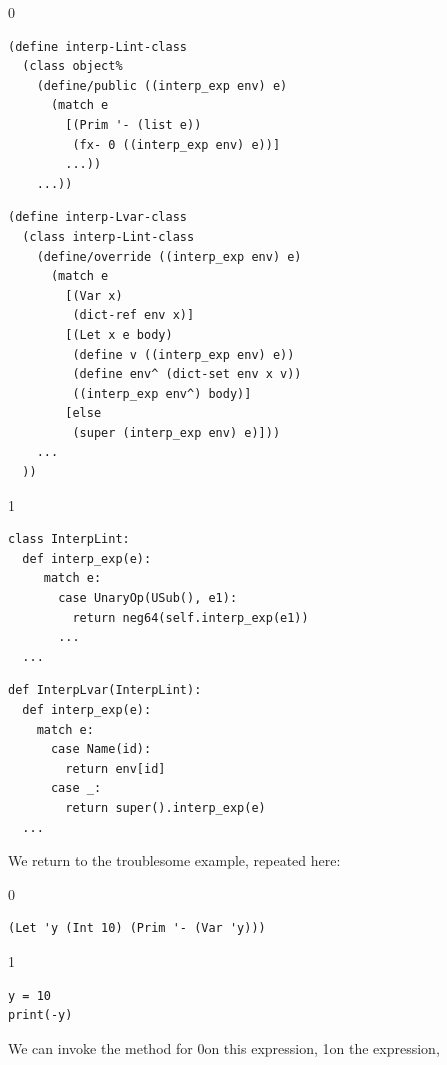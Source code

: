 \documentclass[7x10]{TimesAPriori_MIT}%
\def\racketEd{0}
\def\pythonEd{1}
\def\edition{1}
\newcommand{\racket}[1]{{\if\edition\racketEd{#1}\fi}}
\newcommand{\pythonColor}[0]{}
\newcommand{\python}[1]{{\if\edition\pythonEd\pythonColor #1\fi}}
\numberwithin{theorem}{chapter}
\numberwithin{definition}{chapter}
\numberwithin{equation}{chapter}
\begin{document}
\begin{center}
  \hspace{-20pt}
{\if\edition\racketEd  
\begin{minipage}{0.45\textwidth}
\begin{lstlisting}
(define interp-Lint-class
  (class object%
    (define/public ((interp_exp env) e)
      (match e
        [(Prim '- (list e))
         (fx- 0 ((interp_exp env) e))]
        ...))
    ...))
\end{lstlisting}
\end{minipage}
\begin{minipage}{0.45\textwidth}
  \begin{lstlisting}
(define interp-Lvar-class
  (class interp-Lint-class
    (define/override ((interp_exp env) e)
      (match e
        [(Var x)
         (dict-ref env x)]
        [(Let x e body)
         (define v ((interp_exp env) e))
         (define env^ (dict-set env x v))
         ((interp_exp env^) body)]
        [else
         (super (interp_exp env) e)]))
    ...
  ))
\end{lstlisting}
\end{minipage}
\fi}
{\if\edition\pythonEd\pythonColor
\begin{minipage}{0.45\textwidth}
\begin{lstlisting}
class InterpLint:
  def interp_exp(e):
     match e:
       case UnaryOp(USub(), e1):
         return neg64(self.interp_exp(e1))
       ...
  ...
\end{lstlisting}
\end{minipage}
\begin{minipage}{0.45\textwidth}
  \begin{lstlisting}
def InterpLvar(InterpLint):
  def interp_exp(e):
    match e:
      case Name(id):
        return env[id]
      case _:
        return super().interp_exp(e)
  ...
\end{lstlisting}
\end{minipage}
\fi}
\end{center}
We return to the troublesome example, repeated here:
{\if\edition\racketEd  
\begin{lstlisting}
(Let 'y (Int 10) (Prim '- (Var 'y)))
\end{lstlisting}
\fi}
{\if\edition\pythonEd\pythonColor
\begin{lstlisting}
y = 10
print(-y)
\end{lstlisting}
\fi}
\noindent We can invoke the  method for \LangVar{}%
\racket{on this expression,}
\python{on the  expression,}
\end{document}
